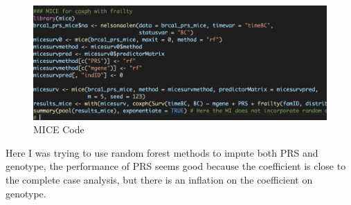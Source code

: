 \documentclass[preprint,12pt]{elsarticle}
\begin{document}
\begin{figure}[!htb]
    \centering
    \includegraphics[width=0.5\linewidth]{Figures/MICE in survival, fail to incorp frailty.png}
    \caption{MICE Code}\label{Fig:MICE no Frailty}
\end{figure}

Here I was trying to use random forest methods to impute both PRS and genotype, the performance of PRS seems good because the coefficient is close to the complete case analysis, but there is an inflation on the coefficient on genotype. 






%
%





\end{document}

